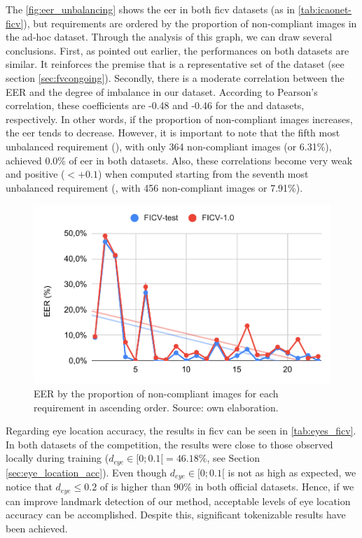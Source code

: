 The \autoref{fig:eer_unbalancing} shows the \acs{eer} in both \acs{ficv} datasets (as in \autoref{tab:icaonet-ficv}), but requirements are ordered by the proportion of non-compliant images in the ad-hoc dataset. Through the analysis of this graph, we can draw several conclusions. First, as pointed out earlier, the performances on both datasets are similar. It reinforces the premise that \ficvtest is a representative set of the \ficvofficial dataset (see section \ref{sec:fvcongoing}). Secondly, there is a moderate correlation between the EER and the degree of imbalance in our dataset. According to Pearson's correlation, these coefficients are -0.48 and -0.46 for the \ficvtest and \ficvofficial datasets, respectively. In other words, if the proportion of non-compliant images increases, the \acs{eer} tends to decrease. However, it is important to note that the fifth most unbalanced requirement (\veiloverface), with only 364 non-compliant images (or 6.31\%), achieved 0.0\% of \acs{eer} in both datasets. Also, these correlations become very weak and positive ($< +0.1$) when computed starting from the seventh most unbalanced requirement (\toodarklight, with 456 non-compliant images or 7.91\%).
 
\begin{figure}[htb]
\centering
\includegraphics[width=0.8\linewidth]{images/graphs/eer_unbalancing.pdf}
\caption{EER by the proportion of non-compliant images for each requirement in ascending order. Source: own elaboration.}
\label{fig:eer_unbalancing}
\end{figure}
 
Regarding eye location accuracy, the results in \acs{ficv} can be seen in \autoref{tab:eyes_ficv}. In both datasets of the competition, the results were close to those observed locally during training ($d_{eye} \in [0;0.1[ = 46.18\%$, see Section \ref{sec:eye_location_acc}). Even though $d_{eye} \in [0;0.1[$ is not as high as expected, we notice that $d_{eye} \leq 0.2$ of \methodname is higher than $90\%$ in both official datasets. Hence, if we can improve landmark detection of our method, acceptable levels of eye location accuracy can be accomplished. Despite this, significant tokenizable results have been achieved.
 
